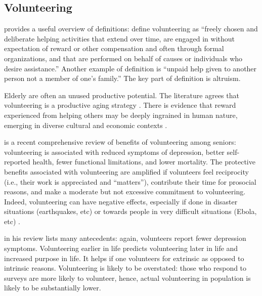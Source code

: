 \documentclass[10pt, letterpaper]{article}
\begin{document}
\begin{spacing}{1.4}
\section{Volunteering}

\citet[][p.177]{wilson12B} provides a useful overview of definitions: 
 define volunteering as
 ``freely chosen and deliberate helping activities that
extend over time, are engaged in without expectation of reward or other
compensation
and often through formal organizations, and that are performed on behalf of
causes or individuals who desire assistance.'' Another example of definition is ``unpaid help given
to another person not a member of one's family.'' The key part of definition is altruism.

Elderly are often an unused productive potential.
The literature agrees that volunteering is a productive aging strategy
\citep[e.g.,][]{wilson12B,hank09}. 
There is evidence that reward experienced from helping others may be deeply
ingrained in human nature, emerging in diverse cultural and economic contexts \citep{aknin13}.

\citet{anderson14} is a recent comprehensive review of benefits of
volunteering among seniors: volunteering is associated with reduced symptoms of
depression, better self-reported health, fewer functional limitations, and lower
mortality. The protective benefits associated with volunteering are amplified if
volunteers feel reciprocity (i.e., their work is appreciated and ``matters''), contribute their
time for prosocial reasons, and make a moderate but not excessive commitment to
volunteering. Indeed, volunteering can have negative effects, especially if done
in disaster situations (earthquakes, etc) or towards people in very difficult
situations (Ebola, etc) \citep{wilson12B}.

\citet{wilson12B} in his review lists many antecedents: again, volunteers report fewer depression symptoms. Volunteering
earlier in life predicts volunteering later in life and increased purpose in
life. It helps if one volunteers for extrinsic as opposed to intrinsic reasons. 
Volunteering is likely to be overstated:  those who
respond to surveys are more likely to volunteer, hence, actual volunteering in
population is likely to be substantially lower. %



\end{spacing}
\end{document}
